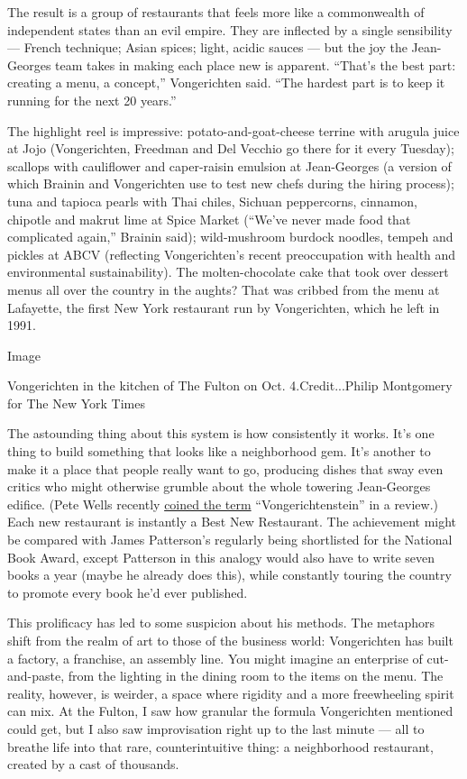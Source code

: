 The result is a group of restaurants that feels more like a commonwealth
of independent states than an evil empire. They are inflected by a
single sensibility --- French technique; Asian spices; light, acidic
sauces --- but the joy the Jean-Georges team takes in making each place
new is apparent. ``That's the best part: creating a menu, a concept,''
Vongerichten said. ``The hardest part is to keep it running for the next
20 years.''

The highlight reel is impressive: potato-and-goat-cheese terrine with
arugula juice at Jojo (Vongerichten, Freedman and Del Vecchio go there
for it every Tuesday); scallops with cauliflower and caper-raisin
emulsion at Jean-Georges (a version of which Brainin and Vongerichten
use to test new chefs during the hiring process); tuna and tapioca
pearls with Thai chiles, Sichuan peppercorns, cinnamon, chipotle and
makrut lime at Spice Market (``We've never made food that complicated
again,'' Brainin said); wild-mushroom burdock noodles, tempeh and
pickles at ABCV (reflecting Vongerichten's recent preoccupation with
health and environmental sustainability). The molten-chocolate cake that
took over dessert menus all over the country in the aughts? That was
cribbed from the menu at Lafayette, the first New York restaurant run by
Vongerichten, which he left in 1991.

Image

Vongerichten in the kitchen of The Fulton on Oct. 4.Credit...Philip
Montgomery for The New York Times

The astounding thing about this system is how consistently it works.
It's one thing to build something that looks like a neighborhood gem.
It's another to make it a place that people really want to go, producing
dishes that sway even critics who might otherwise grumble about the
whole towering Jean-Georges edifice. (Pete Wells recently
\href{https://www.nytimes3xbfgragh.onion/2019/04/23/dining/wayan-restaurant-review.html}{coined
the term} ``Vongerichtenstein'' in a review.) Each new restaurant is
instantly a Best New Restaurant. The achievement might be compared with
James Patterson's regularly being shortlisted for the National Book
Award, except Patterson in this analogy would also have to write seven
books a year (maybe he already does this), while constantly touring the
country to promote every book he'd ever published.

This prolificacy has led to some suspicion about his methods. The
metaphors shift from the realm of art to those of the business world:
Vongerichten has built a factory, a franchise, an assembly line. You
might imagine an enterprise of cut-and-paste, from the lighting in the
dining room to the items on the menu. The reality, however, is weirder,
a space where rigidity and a more freewheeling spirit can mix. At the
Fulton, I saw how granular the formula Vongerichten mentioned could get,
but I also saw improvisation right up to the last minute --- all to
breathe life into that rare, counterintuitive thing: a neighborhood
restaurant, created by a cast of thousands.

